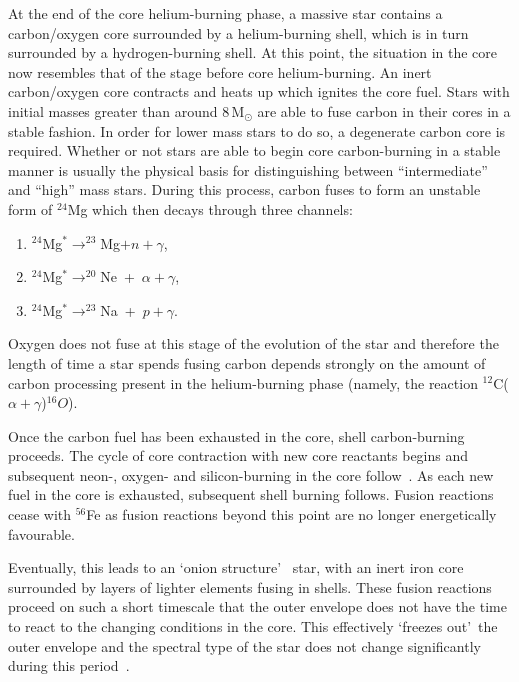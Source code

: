 {At the end of the core helium-burning phase, a massive star contains a carbon/oxygen core surrounded by a helium-burning shell, which is in turn surrounded by a hydrogen-burning shell.
At this point, the situation in the core now resembles that of the stage before core helium-burning.
An inert carbon/oxygen core contracts and heats up which ignites the core fuel.
Stars with initial masses greater than around 8\,M$_{\odot}$ are able to fuse carbon in their cores in a stable fashion.
In order for lower mass stars to do so, a degenerate carbon core is required.
Whether or not stars are able to begin core carbon-burning in a stable manner is usually the physical basis for distinguishing between ``intermediate'' and ``high'' mass stars.
During this process, carbon fuses to form an unstable form of $^{24}$Mg which then decays through three channels:

\begin{enumerate}
    \item $^{24}$Mg$^{*}\rightarrow ^{23}$Mg$+n+\gamma$,
    \item $^{24}$Mg$^{*}\rightarrow ^{20}$Ne~+~$\alpha+\gamma$,
    \item $^{24}$Mg$^{*}\rightarrow ^{23}$Na~+~$p+\gamma$.
\end{enumerate}

Oxygen does not fuse at this stage of the evolution of the star and therefore the length of time a star spends fusing carbon depends strongly on the amount of carbon processing present in the helium-burning phase (namely, the reaction $^{12}$C($\alpha+\gamma$)$^{16}O$).

Once the carbon fuel has been exhausted in the core, shell carbon-burning proceeds.
The cycle of core contraction with new core reactants begins and subsequent neon-, oxygen- and silicon-burning in the core follow~\citep{Woosley02}.
As each new fuel in the core is exhausted, subsequent shell burning follows.
Fusion reactions cease with $^{56}$Fe as fusion reactions beyond this point are no longer energetically favourable.

Eventually, this leads to an \textquoteleft onion structure\textquoteright
~star, with an inert iron core surrounded by layers of lighter elements fusing in shells.
These fusion reactions proceed on such a short timescale that the outer envelope does not have the time to react to the changing conditions in the core.
This effectively \textquoteleft freezes out\textquoteright ~the outer envelope and the spectral type of the star does not change significantly during this period~\citep{Meynet11}.

}
